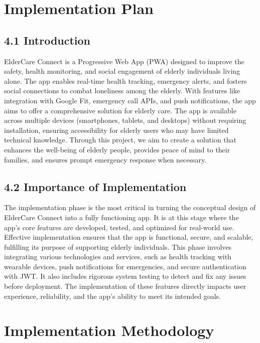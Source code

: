 \documentclass[a4paper, 12pt]{article} %
\begin{document}
\section{\textbf{\LARGE Implementation Plan}}

\subsection{\textbf{\Large 4.1 Introduction}}
ElderCare Connect is a Progressive Web App (PWA) designed to improve the safety, health monitoring, and social engagement of elderly individuals living alone. The app enables real-time health tracking, emergency alerts, and fosters social connections to combat loneliness among the elderly. With features like integration with Google Fit, emergency call APIs, and push notifications, the app aims to offer a comprehensive solution for elderly care.  
The app is available across multiple devices (smartphones, tablets, and desktops) without requiring installation, ensuring accessibility for elderly users who may have limited technical knowledge. Through this project, we aim to create a solution that enhances the well-being of elderly people, provides peace of mind to their families, and ensures prompt emergency response when necessary.

\subsection{\textbf{\Large 4.2 Importance of Implementation}}
The implementation phase is the most critical in turning the conceptual design of ElderCare Connect into a fully functioning app. It is at this stage where the app's core features are developed, tested, and optimized for real-world use. Effective implementation ensures that the app is functional, secure, and scalable, fulfilling its purpose of supporting elderly individuals.  
This phase involves integrating various technologies and services, such as health tracking with wearable devices, push notifications for emergencies, and secure authentication with JWT. It also includes rigorous system testing to detect and fix any issues before deployment. The implementation of these features directly impacts user experience, reliability, and the app's ability to meet its intended goals.

\section{\textbf{\LARGE Implementation Methodology}}
\end{document}

